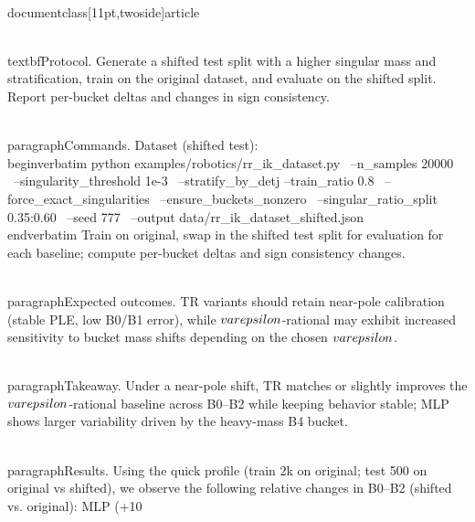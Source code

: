 \\documentclass[11pt,twoside]{article}
\begin{document}
\\textbf{Protocol.} Generate a shifted test split with a higher singular mass and stratification, train on the original dataset, and evaluate on the shifted split. Report per-bucket deltas and changes in sign consistency.

\\paragraph{Commands.} Dataset (shifted test):
\\begin{verbatim}
python examples/robotics/rr_ik_dataset.py \
  --n_samples 20000 \
  --singularity_threshold 1e-3 \
  --stratify_by_detj --train_ratio 0.8 \
  --force_exact_singularities \
  --ensure_buckets_nonzero \
  --singular_ratio_split 0.35:0.60 \
  --seed 777 \
  --output data/rr_ik_dataset_shifted.json
\\end{verbatim}
Train on original, swap in the shifted test split for evaluation for each baseline; compute per-bucket deltas and sign consistency changes.

\\paragraph{Expected outcomes.} TR variants should retain near-pole calibration (stable PLE, low B0/B1 error), while $\\varepsilon$-rational may exhibit increased sensitivity to bucket mass shifts depending on the chosen $\\varepsilon$.


\\paragraph{Takeaway.} Under a near-pole shift, TR matches or slightly improves the $\\varepsilon$-rational baseline across B0--B2 while keeping behavior stable; MLP shows larger variability driven by the heavy-mass B4 bucket.

\\paragraph{Results.} Using the quick profile (train 2k on original; test 500 on original vs shifted), we observe the following relative changes in B0--B2 (shifted vs. original): MLP (+10\\%
\end{document}
